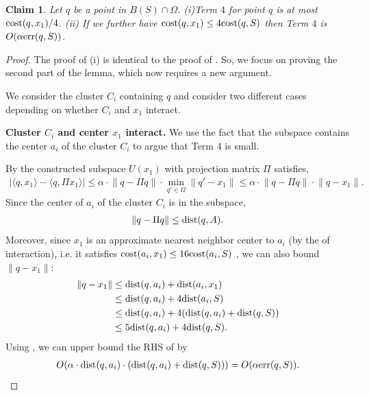 \documentclass[11pt]{article}
\newtheorem{claim}[lemma]{Claim}
\theoremstyle{restate}
\theoremstyle{definition}
\newcommand{\norm}[1]{\ensuremath{\|#1\|}}
\newcommand{\dist}{\textnormal{dist}}
\newcommand{\cost}{\textnormal{cost}}
\newcommand{\err}{\textnormal{err}}
\begin{document}
\begin{claim}\label{clm:bounding-term4-2}
 Let $q$ be a point in $B(S) \cap \Omega$. (i)Term $4$ for point $q$ is at most $\cost(q,x_1)/4$. (ii) If we further have $\cost(q, x_1) \leq 4 \cost(q,S)$ then Term $4$ is $O(\alpha \err(q,S))$.
\end{claim}
\begin{proof}
    The proof of (i) is identical to the proof of . So, we focus on proving the second part of the lemma, which now requires a new argument.


    We consider the cluster $C_i$ containing $q$ and consider two different cases depending on whether $C_i$ and $x_1$ interact.
    
    \textbf{Cluster $C_i$ and center $x_1$ interact. } We use the fact that the subspace contains the center $a_i$ of the cluster $C_i$ to argue that Term $4$ is small.

    
     By  the constructed subspace $U(x_1)$ with projection matrix $\Pi$ satisfies,
\begin{align}\label{eq: inter-guarantee-2}
    |\langle q,x_1 \rangle - \langle q, \Pi x_1\rangle| \leq \alpha \cdot \norm{q - \Pi q} \cdot \min_{q' \in \Omega} \norm{q' - x_1} \leq \alpha \cdot \norm{q - \Pi q} \cdot \norm{q - x_1}.
\end{align}
Since the center of $a_i$ of the cluster $C_i$ is in the subspace, 
\begin{align}\label{eq: net-eq-step-1}\norm{q - \Pi q} \leq \dist(q,A).
\end{align}
Moreover, since $x_1$ is an approximate nearest neighbor center to $a_i$ (by the  of interaction), i.e. it satisfies $\cost(a_i, x_1) \leq 16\cost(a_i, S)$ , we can also bound $\norm{q - x_1}$: 
\begin{align}\label{eq: net-eq-step-2}
    \norm{q - x_1} &\leq \dist(q, a_i) + \dist(a_i, x_1) \nonumber\\
    &\leq \dist(q, a_i) + 4 \dist(a_i, S)  \nonumber\\
    &\leq \dist(q,a_i) + 4(\dist(q,a_i) + \dist(q,S))\nonumber\\
    &\leq 5\dist(q,a_i) +4\dist(q,S).
\end{align}
Using ,   we can upper bound the RHS of  by  \begin{align*}
    O(\alpha \cdot  \dist(q,a_i) \cdot (\dist(q,a_i) + \dist(q,S)))  = O(\alpha \err(q,S)).
\end{align*}


\end{proof}
\end{document}
